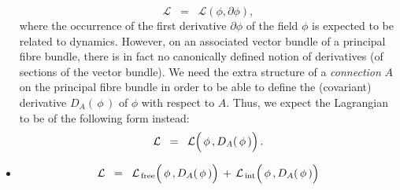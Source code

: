 \begin{itemize}
	\begin{equation*}
	\mathcal{L} \;\; = \;\; \mathcal{L}(\phi,\partial\phi),
	\end{equation*}
	where the occurrence of the first derivative $\partial\phi$ of the field $\phi$ is expected to be related to dynamics.
	\vskip 0.1cm
	However, on an associated vector bundle of a principal fibre bundle, there is in fact no canonically defined notion
	of derivatives (of sections of the vector bundle).
	We need the extra structure of a \textit{connection} $A$ on the principal fibre bundle
	in order to be able to define the (covariant) derivative $D_{A}(\,\phi\,)$ of $\phi$ with respect to $A$.
	Thus, we expect the Lagrangian to be of the following form instead:
	\begin{equation*}
	\mathcal{L} \;\; = \;\; \mathcal{L}\!\left(\,\overset{{\color{white}.}}{\phi}\,,D_{A}(\,\phi\,)\right).
	\end{equation*}
\item
	\begin{equation*}
	\mathcal{L}
	\;\; = \;\;
		\mathcal{L}_{\textnormal{\,free}}\!\left(\,\overset{{\color{white}.}}{\phi}\,,D_{A}(\,\phi\,)\right)
	\,+\,
		\mathcal{L}_{\textnormal{\,int}}\!\left(\,\overset{{\color{white}.}}{\phi}\,,D_{A}(\,\phi\,)\right)
	\end{equation*}
\end{itemize}


